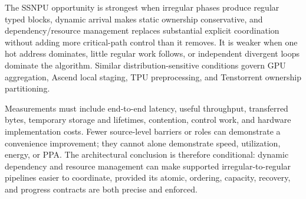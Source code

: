 The SSNPU opportunity is strongest when irregular phases produce regular typed blocks, dynamic arrival makes static ownership conservative, and dependency/resource management replaces substantial explicit coordination without adding more critical-path control than it removes. It is weaker when one hot address dominates, little regular work follows, or independent divergent loops dominate the algorithm. Similar distribution-sensitive conditions govern GPU aggregation, Ascend local staging, TPU preprocessing, and Tenstorrent ownership partitioning.

Measurements must include end-to-end latency, useful throughput, transferred bytes, temporary storage and lifetimes, contention, control work, and hardware implementation costs. Fewer source-level barriers or roles can demonstrate a convenience improvement; they cannot alone demonstrate speed, utilization, energy, or PPA. The architectural conclusion is therefore conditional: dynamic dependency and resource management can make supported irregular-to-regular pipelines easier to coordinate, provided its atomic, ordering, capacity, recovery, and progress contracts are both precise and enforced.
